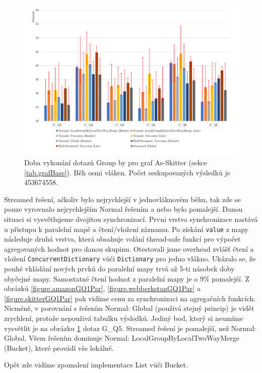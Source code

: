 \begin{figure}[!htp]
\includegraphics[width=\linewidth]{../img/skitterGroupByPar.pdf}\centering
\caption{Doba vykonání dotazů Group by pro graf As-Skitter (sekce \ref{tab.grafBase}). Běh osmi vláken. Počet seskupovaných výsledků je 453674558.}
\label{figure.skitterGroupByPar}
\end{figure}

Streamed řešení, ačkoliv bylo nejrychlejší v jednovláknovém běhu, tak zde se pouze vyrovnalo nejrychlejším Normal řešením a nebo bylo pomalejší.
Danou situaci si vysvětlujeme dvojitou synchronizací. 
Prvni vrstva synchronizace nastává u přistupu k paralelní mapě a čtení/vložení záznamu.
Po získání \verb+value+ z mapy následuje druhá vrstva, která obsahuje volání thread-safe funkcí pro výpočet agregovaných hodnot pro danou skupinu.
Otestovali jsme overhead zvlášť čtení a vložení \verb+ConcurrentDictionary+ vůči \verb+Dictionary+ pro jedno vlákno. 
Ukázalo se, že pouhé vkládání nových prvků do paralelní mapy trvá až 5-ti násobek doby obyčejné mapy.
Samostatné čtení hodnot z paralelní mapy je o 9\% pomalejší.
Z obrázků \ref{figure.amazonGQ1Par}, \ref{figure.webberkstanGQ1Par} a \ref{figure.skitterGQ1Par} pak vidíme cenu za synchronizaci na agregačních funkcích.
Nicméně, v porovnání s řešením Normal: Global (použivá stejný princip) je vidět zrychlení, protože nepouživá tabulku výsledků.
Jediný bod, který si neumíme vysvětlit je na obrázku \ref{figure.skitterGroupByPar} dotaz G\_Q5. 
Streamed řešení je pomalejší, než Normal: Global.
Všem řešením dominuje Normal: LocalGroupByLocalTwoWayMerge (Bucket), které provádí vše lokálně.

Opět zde vidíme zpomalení implementace List vůči Bucket.

